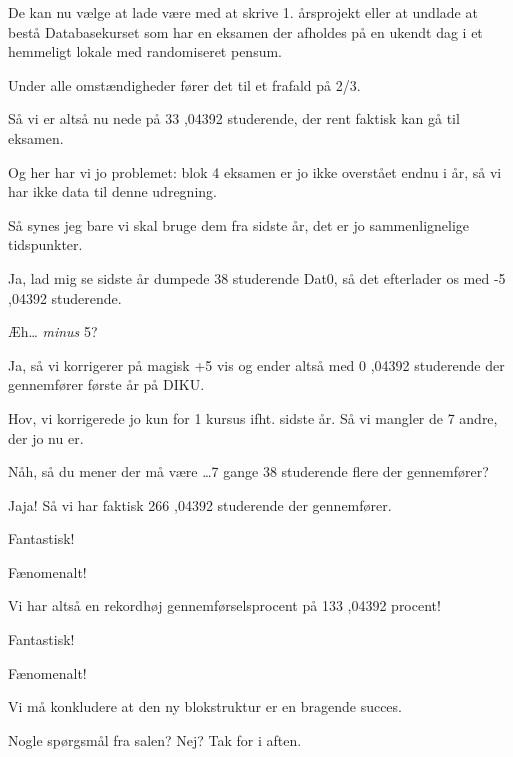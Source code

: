 \documentclass[a4paper,11pt]{article}
\begin{document}
\begin{sketch}
 De kan nu vælge at lade være med at skrive 1. årsprojekt eller at undlade at bestå Databasekurset som har en eksamen der afholdes på en ukendt dag i et hemmeligt lokale med randomiseret pensum.

 Under alle omstændigheder fører det til et frafald på 2/3.

 Så vi er altså nu nede på 33  ,04392  studerende, der rent faktisk kan gå til eksamen.

 Og her har vi jo problemet: blok 4 eksamen er jo ikke overstået endnu i år, så vi har ikke data til denne udregning.

 Så synes jeg bare vi skal bruge dem fra sidste år, det er jo sammenlignelige tidspunkter.

 Ja, lad mig se  sidste år dumpede 38
studerende Dat0, så det efterlader os med -5  ,04392
 studerende.

 Æh\ldots{} \emph{minus} 5?

 Ja, så vi korrigerer på magisk +5 vis og ender altså med 0
 ,04392  studerende der gennemfører første år på DIKU.

 Hov, vi korrigerede jo kun for 1 kursus ifht. sidste år. Så vi mangler de 7 andre, der jo nu er.

 Nåh, så du mener der må være \ldots 7 gange 38 studerende flere der gennemfører?

 Jaja! Så vi har faktisk  266  ,04392  studerende der gennemfører.


 Fantastisk!

 Fænomenalt!

 Vi har altså en rekordhøj gennemførselsprocent på 133  ,04392  procent!

 Fantastisk!

 Fænomenalt!

 Vi må konkludere at den ny blokstruktur er en bragende succes.

 Nogle spørgsmål fra salen? Nej? Tak for i aften.


\end{sketch}
\end{document}
